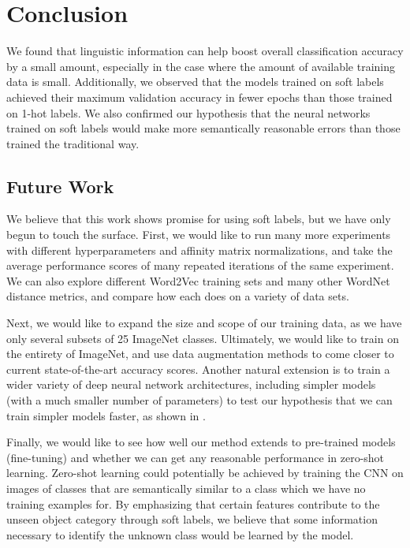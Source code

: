 \section{Conclusion}

We found that linguistic information can help boost overall classification
accuracy by a small amount, especially in the case where the amount of available
training data is small.
Additionally, we observed that the models trained on soft labels achieved their
maximum validation accuracy in fewer epochs than those trained on 1-hot labels.
We also confirmed our hypothesis that the neural networks trained on soft
labels would make more semantically reasonable errors than those trained the
traditional way.


\subsection{Future Work}

We believe that this work shows promise for using soft labels, but we have only
begun to touch the surface.
First, we would like to run many more experiments with different
hyperparameters and affinity matrix normalizations, and take the average
performance scores of many repeated iterations of the same experiment.  We can
also explore different Word2Vec training sets and many other WordNet distance
metrics, and compare how each does on a variety of data sets.

Next, we would like to expand the size and scope of our training data, as we
have only several subsets of 25 ImageNet classes. Ultimately, we would like to
train on the entirety of ImageNet, and use data augmentation methods to come
closer to current state-of-the-art accuracy scores.
Another natural extension is to train a wider variety of deep neural network
architectures, including simpler models (with a much smaller number of
parameters) to test our hypothesis that we can train simpler models faster,
as shown in \cite{hinton2015distilling}.

Finally, we would like to see how well our method extends to pre-trained models
(fine-tuning) and whether we can get any reasonable performance in zero-shot
learning. Zero-shot learning could potentially be achieved by training the CNN
on images of classes that are semantically similar to a class which we have no
training examples for. By emphasizing that certain features contribute to the
unseen object category through soft labels, we believe that some information
necessary to identify the unknown class would be learned by the model.
